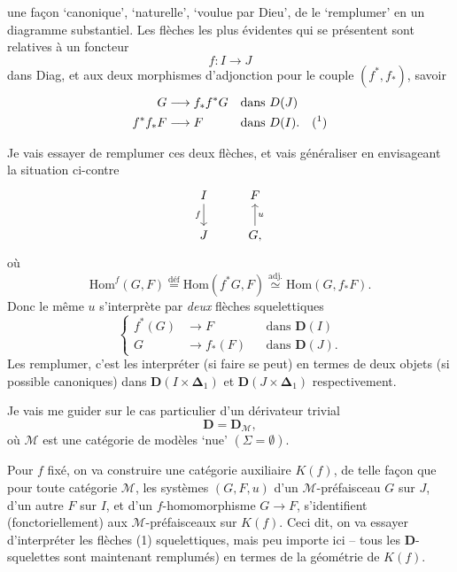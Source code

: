 \documentclass[11pt]{article}
\newcommand{\printedpage}[1]{\marginpar{\footnotesize p.~#1}}
\newcommand{\msp}[1]{\marginpar{\footnotesize [#1]}}
\newcommand{\Hom}{\mathrm{Hom}}
\newcommand{\bDelta}{\boldsymbol{\Delta}}
\begin{document}
\printedpage{4}
\msp{page 78}
une façon ‘canonique’, ‘naturelle’, ‘voulue par Dieu’, de le ‘remplumer’ en un diagramme substantiel. Les flèches les plus évidentes qui se présentent sont relatives à un foncteur
\[ f : I \longrightarrow J \]
dans Diag, et aux deux morphismes d'adjonction pour le couple $(f^*, f_*)$, savoir
\[
\begin{aligned}
G &\longrightarrow f_*f^*G && \text{dans } D(J)\\
f^*f_*F &\longrightarrow F && \text{dans } D(I). \quad (\text{\footnotemark})
\end{aligned}
\]

Je vais essayer de remplumer ces deux flèches, et vais généraliser en envisageant la situation ci-contre 
\[
\begin{tikzcd}
I \arrow[d, "f"'] & F \\
J & G, \arrow[u, "u"']
\end{tikzcd}
\]
où
\[ \Hom^f(G,F) \overset{\text{déf}}{=} \Hom(f^*G,F) \overset{\text{adj.}}{\simeq} \Hom(G,f_*F). \]
Donc le même $u$ s'interprète par \textit{deux} flèches squelettiques
\[
\left\{
\begin{aligned}
f^*(G) &\longrightarrow F && \text{dans } \mathbf{D}(I)\\
G &\longrightarrow f_*(F) && \text{dans } \mathbf{D}(J).
\end{aligned}
\right.
\tag*{(1)}
\]
Les remplumer, c'est les interpréter (si faire se peut) en termes de deux objets (si possible canoniques) dans $\mathbf{D}(I \times \bDelta_1)$ et $\mathbf{D}(J \times \bDelta_1)$ respectivement.

Je vais me guider sur le cas particulier d'un dérivateur trivial
\[ \mathbf{D} = \mathbf{D}_{\mathcal{M}}, \]
où $\mathcal{M}$ est une catégorie de modèles ‘nue’ $(\Sigma = \emptyset)$.

\msp{page 79}
Pour $f$ fixé, on va construire une catégorie auxiliaire $K(f)$, de telle façon que pour toute catégorie $\mathcal{M}$, les systèmes $(G,F,u)$ d'un $\mathcal{M}$-préfaisceau $G$ sur $J$, d'un autre $F$ sur $I$, et d'un $f$-homomorphisme $G \longrightarrow F$, s'identifient (fonctoriellement) aux $\mathcal{M}$-préfaisceaux sur
\printedpage{5}
$K(f)$. Ceci dit, on va essayer d'interpréter les flèches (1) squelettiques, mais peu importe ici -- tous les $\mathbf{D}$-squelettes sont maintenant remplumés) en termes de la géométrie de $K(f)$. %
\end{document}
